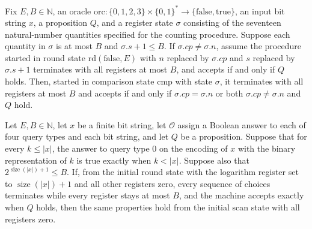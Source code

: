 \begin{theorem}
\label{Complexity.LogProg.ISGen.cmp_run}
\leanok
{}
Fix $E,B\in\mathbb N$, an oracle
$\mathrm{orc}:\{0,1,2,3\}\times\{0,1\}^*\to\{\mathrm{false},\mathrm{true}\}$, an input
bit string $x$, a proposition $Q$, and a register state $\sigma$ consisting of the
seventeen natural-number quantities specified for the counting procedure. Suppose each
quantity in $\sigma$ is at most $B$ and $\sigma.s+1\le B$. If $\sigma.cp\ne\sigma.n$,
assume the procedure started in round state $\mathrm{rd}(\mathrm{false},E)$ with $n$
replaced by $\sigma.cp$ and $s$ replaced by $\sigma.s+1$ terminates with all registers
at most $B$, and accepts if and only if $Q$ holds. Then, started in comparison state
$\mathrm{cmp}$ with state $\sigma$, it terminates with all registers at most $B$ and
accepts if and only if $\sigma.cp=\sigma.n$ or both $\sigma.cp\ne\sigma.n$ and $Q$ hold.
\end{theorem}

\begin{theorem}
\label{Complexity.LogProg.ISGen.start_run}
\leanok
{}
Let $E,B\in\mathbb{N}$, let $x$ be a finite bit string, let $\mathcal{O}$ assign a
Boolean answer to each of four query types and each bit string, and let $Q$ be a
proposition. Suppose that for every $k\le |x|$, the answer to query type $0$ on the
encoding of $x$ with the binary representation of $k$ is true exactly when $k<|x|$.
Suppose also that $2^{\operatorname{size}(|x|)+1}\le B$. If, from the initial round
state with the logarithm register set to $\operatorname{size}(|x|)+1$ and all other
registers zero, every sequence of choices terminates while every register stays at most
$B$, and the machine accepts exactly when $Q$ holds, then the same properties hold from
the initial scan state with all registers zero.
\end{theorem}
